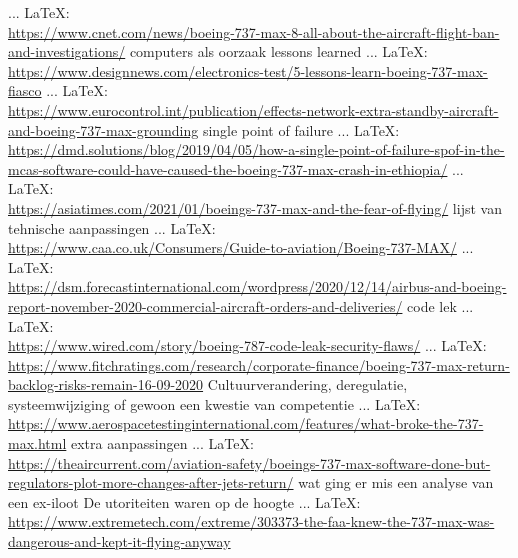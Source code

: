 \begin{thebibliography}{99}
{{{			 ... \LaTeX:\\ \url{https://www.cnet.com/news/boeing-737-max-8-all-about-the-aircraft-flight-ban-and-investigations/}
			computers als oorzaak
			lessons learned
			 ... \LaTeX:\\ \url{https://www.designnews.com/electronics-test/5-lessons-learn-boeing-737-max-fiasco}
			 ... \LaTeX:\\ \url{https://www.eurocontrol.int/publication/effects-network-extra-standby-aircraft-and-boeing-737-max-grounding}
			single point of failure
			 ... \LaTeX:\\ \url{https://dmd.solutions/blog/2019/04/05/how-a-single-point-of-failure-spof-in-the-mcas-software-could-have-caused-the-boeing-737-max-crash-in-ethiopia/}
			 ... \LaTeX:\\ \url{https://asiatimes.com/2021/01/boeings-737-max-and-the-fear-of-flying/}
			lijst van tehnische aanpassingen
			 ... \LaTeX:\\ \url{https://www.caa.co.uk/Consumers/Guide-to-aviation/Boeing-737-MAX/}
			 ... \LaTeX:\\ \url{https://dsm.forecastinternational.com/wordpress/2020/12/14/airbus-and-boeing-report-november-2020-commercial-aircraft-orders-and-deliveries/}
			code lek
			 ... \LaTeX:\\ \url{https://www.wired.com/story/boeing-787-code-leak-security-flaws/}
			 ... \LaTeX:\\ \url{https://www.fitchratings.com/research/corporate-finance/boeing-737-max-return-backlog-risks-remain-16-09-2020}
			Cultuurverandering, deregulatie, systeemwijziging of gewoon een kwestie van competentie
			 ... \LaTeX:\\ \url{https://www.aerospacetestinginternational.com/features/what-broke-the-737-max.html}
			extra aanpassingen
			 ... \LaTeX:\\ \url{https://theaircurrent.com/aviation-safety/boeings-737-max-software-done-but-regulators-plot-more-changes-after-jets-return/}
			wat ging er mis een analyse van een ex-iloot
			De utoriteiten waren op de hoogte
			 ... \LaTeX:\\ \url{https://www.extremetech.com/extreme/303373-the-faa-knew-the-737-max-was-dangerous-and-kept-it-flying-anyway}
}}}
\end{thebibliography}
